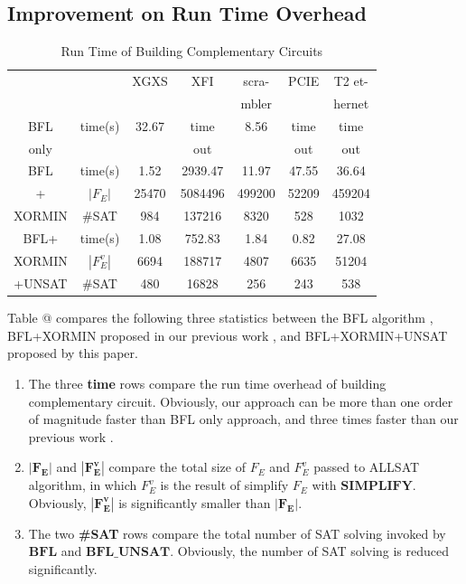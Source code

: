 \documentclass[journal]{IEEEtran}
\makeatletter
\newcommand{\Rmnum}[1]{\expandafter\@slowromancap\romannumeral #1@}
\makeatother
\begin{document}
\subsection{Improvement on Run Time Overhead}
\begin{table}[!t]
\centering
\caption{Run Time of Building Complementary Circuits}
\begin{tabular}{|c|c|c|c|c|c|c|}
\hline
            &&XGXS&XFI& scra-   &PCIE&T2 et-	  \\
            &&       &      & mbler&    &  hernet      	  \\ \hline
BFL    &time(s)&32.67   &time&8.56&time&time 		     \\
only&&&out&&out&out 		     \\ \hline
BFL    &time(s)&1.52   &2939.47&11.97     &47.55&36.64 		     \\ \cline{2-7}
+   &$|F_E|$&25470&5084496&499200&52209&459204\\ \cline{2-7}
XORMIN      &\#SAT&984&137216&8320&528&1032        	  \\ \hline
BFL+     &time(s)&1.08   &752.83 &1.84      &0.82& 27.08       	  \\ \cline{2-7}
XORMIN     &$|F_E^v|$&6694&188717&4807&6635&51204\\ \cline{2-7}
+UNSAT       &\#SAT&480&16828&256&243&538        	  \\ \hline
\end{tabular}
\end{table}
Table \Rmnum{3} compares the following three statistics between the BFL algorithm \cite{MINASS}, 
BFL+XORMIN proposed in our previous work \cite{ShegnYuShen:iccad09},
and BFL+XORMIN+UNSAT proposed by this paper.
\begin{enumerate}
\item The three \textbf{time} rows compare the run time overhead of building complementary circuit.
Obviously,
our approach can be more than one order of magnitude faster than BFL only approach,
and three times faster than our previous work \cite{ShegnYuShen:iccad09}.
\item $\boldsymbol{|F_E|}$ and $\boldsymbol{|F_E^v|}$ compare the total size of $F_E$ and $F_E^v$ passed to ALLSAT algorithm,
in which $F_E^v$ is the result of simplify $F_E$ with $\boldsymbol{SIMPLIFY}$.
Obviously,
$\boldsymbol{|F_E^v|}$ is significantly smaller than $\boldsymbol{|F_E|}$.
\item The two \textbf{\#SAT} rows compare the total number of SAT solving invoked by $\boldsymbol{BFL}$ and $\boldsymbol{BFL\_UNSAT}$.
Obviously,
the number of SAT solving is reduced significantly.
\end{enumerate}
\end{document}
